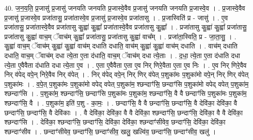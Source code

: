 \documentclass[17pt]{extarticle}
\begin{document}
40. ज॒न॒य॒ति॒ प्र॒जासु॑ प्र॒जासु॑ जनयति जनयति प्र॒जास्वे॒वैव प्र॒जासु॑ जनयति जनयति प्र॒जास्वे॒व । . प्र॒जास्वे॒वैव प्र॒जासु॑ प्र॒जास्वे॒व प्रजा॑तासु॒ प्रजा॑तास्वे॒व प्र॒जासु॑ प्र॒जास्वे॒व प्रजा॑तासु । . प्र॒जास्विति॑ प्र - जासु॑ । . ए॒व प्रजा॑तासु॒ प्रजा॑तास्वे॒वैव प्रजा॑तासु कु॒ह्वा॑ कु॒ह्वा᳚ प्रजा॑तास्वे॒वैव प्रजा॑तासु कु॒ह्वा᳚ । . प्रजा॑तासु कु॒ह्वा॑ कु॒ह्वा᳚ प्रजा॑तासु॒ प्रजा॑तासु कु॒ह्वा॑ वाच॒म् ॅवाच॑म् कु॒ह्वा᳚ प्रजा॑तासु॒ प्रजा॑तासु कु॒ह्वा॑ वाच᳚म् । . प्रजा॑ता॒स्विति॒ प्र - जा॒ता॒सु॒ । . कु॒ह्वा॑ वाच॒म् ॅवाच॑म् कु॒ह्वा॑ कु॒ह्वा॑ वाच॑म् दधाति दधाति॒ वाच॑म् कु॒ह्वा॑ कु॒ह्वा॑ वाच॑म् दधाति । . वाच॑म् दधाति दधाति॒ वाच॒म् ॅवाच॑म् दधा त्ये॒ता ए॒ता द॑धाति॒ वाच॒म् ॅवाच॑म् दधा त्ये॒ताः । . द॒धा॒ त्ये॒ता ए॒ता द॑धाति दधा त्ये॒ता ए॒वैवैता द॑धाति दधा त्ये॒ता ए॒व । . ए॒ता ए॒वैवैता ए॒ता ए॒व निर् णिरे॒वैता ए॒ता ए॒व निः । . ए॒व निर् णिरे॒वैव निर् व॑पेद् वपे॒न् निरे॒वैव निर् व॑पेत् । . निर् व॑पेद् वपे॒न् निर् णिर् व॑पेत् प॒शुका॑मः प॒शुका॑मो वपे॒न् निर् णिर् व॑पेत् प॒शुका॑मः । . व॒पे॒त् प॒शुका॑मः प॒शुका॑मो वपेद् वपेत् प॒शुका॑म॒ श्छन्दाꣳ॑सि॒ छन्दाꣳ॑सि प॒शुका॑मो वपेद् वपेत् 
प॒शुका॑म॒ श्छन्दाꣳ॑सि । . प॒शुका॑म॒ श्छन्दाꣳ॑सि॒ छन्दाꣳ॑सि प॒शुका॑मः प॒शुका॑म॒ श्छन्दाꣳ॑सि॒ वै वै छन्दाꣳ॑सि प॒शुका॑मः प॒शुका॑म॒ श्छन्दाꣳ॑सि॒ वै । . प॒शुका॑म॒ इति॑ प॒शु - का॒मः॒ । . छन्दाꣳ॑सि॒ वै वै छन्दाꣳ॑सि॒ छन्दाꣳ॑सि॒ वै देवि॑का॒ देवि॑का॒ वै छन्दाꣳ॑सि॒ छन्दाꣳ॑सि॒ वै देवि॑काः । . वै देवि॑का॒ देवि॑का॒ वै वै देवि॑का॒ श्छन्दाꣳ॑सि॒ छन्दाꣳ॑सि॒ देवि॑का॒ वै वै देवि॑का॒ श्छन्दाꣳ॑सि । . देवि॑का॒ श्छन्दाꣳ॑सि॒ छन्दाꣳ॑सि॒ देवि॑का॒ देवि॑का॒ श्छन्दाꣳ॑सीवेव॒ छन्दाꣳ॑सि॒ देवि॑का॒ देवि॑का॒ श्छन्दाꣳ॑सीव । . छन्दाꣳ॑सीवेव॒ छन्दाꣳ॑सि॒ छन्दाꣳ॑सीव॒ खलु॒ खल्वि॑व॒ छन्दाꣳ॑सि॒ छन्दाꣳ॑सीव॒ खलु॑ । \newline
\pagebreak
{}
\end{document}
